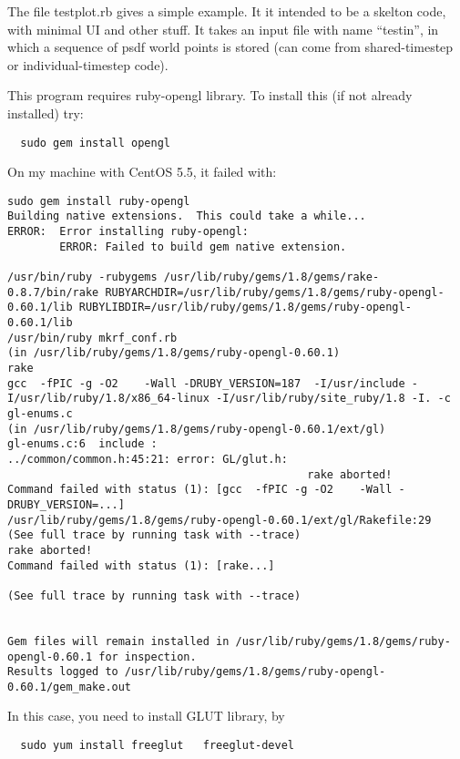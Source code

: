 \documentclass[12pt]{article}
\begin{document}
The file testplot.rb gives a simple example. It it intended to be a
skelton code, with minimal UI and other stuff. It takes an input file
with name ``testin'', in which a sequence of psdf world points is
stored (can come from shared-timestep or individual-timestep code).

This program requires ruby-opengl library. To install this (if not
already installed) try:
\begin{verbatim}
  sudo gem install opengl
\end{verbatim}
On my machine with CentOS 5.5, it failed with:
\begin{verbatim}
sudo gem install ruby-opengl
Building native extensions.  This could take a while...
ERROR:  Error installing ruby-opengl:
        ERROR: Failed to build gem native extension.

/usr/bin/ruby -rubygems /usr/lib/ruby/gems/1.8/gems/rake-0.8.7/bin/rake RUBYARCHDIR=/usr/lib/ruby/gems/1.8/gems/ruby-opengl-0.60.1/lib RUBYLIBDIR=/usr/lib/ruby/gems/1.8/gems/ruby-opengl-0.60.1/lib
/usr/bin/ruby mkrf_conf.rb
(in /usr/lib/ruby/gems/1.8/gems/ruby-opengl-0.60.1)
rake
gcc  -fPIC -g -O2    -Wall -DRUBY_VERSION=187  -I/usr/include -I/usr/lib/ruby/1.8/x86_64-linux -I/usr/lib/ruby/site_ruby/1.8 -I. -c gl-enums.c
(in /usr/lib/ruby/gems/1.8/gems/ruby-opengl-0.60.1/ext/gl)
gl-enums.c:6  include :
../common/common.h:45:21: error: GL/glut.h: 
                                              rake aborted!
Command failed with status (1): [gcc  -fPIC -g -O2    -Wall -DRUBY_VERSION=...]
/usr/lib/ruby/gems/1.8/gems/ruby-opengl-0.60.1/ext/gl/Rakefile:29
(See full trace by running task with --trace)
rake aborted!
Command failed with status (1): [rake...]

(See full trace by running task with --trace)


Gem files will remain installed in /usr/lib/ruby/gems/1.8/gems/ruby-opengl-0.60.1 for inspection.
Results logged to /usr/lib/ruby/gems/1.8/gems/ruby-opengl-0.60.1/gem_make.out
\end{verbatim}

In this case, you need to install GLUT library, by
\begin{verbatim}
  sudo yum install freeglut   freeglut-devel
\end{verbatim}

    
\end{document}
